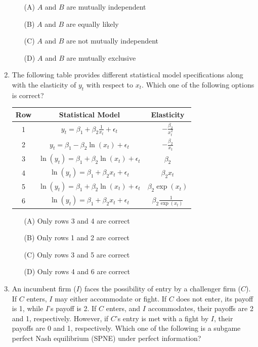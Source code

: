 \documentclass[journal,12pt,onecolumn]{exam}
\theoremstyle{remark}
\begin{document}
\begin{enumerate}
\begin{enumerate}
    \item[(A)] \(A\) and \(B\) are mutually independent
    \item[(B)] \(A\) and \(B\) are equally likely
    \item[(C)] \(A\) and \(B\) are not mutually independent
    \item[(D)] \(A\) and \(B\) are mutually exclusive
\end{enumerate}

\item The following table provides different statistical model specifications along with the elasticity of \( y_t \) with respect to \( x_t \). Which one of the following options is correct?

\begin{table}[h]
\centering
\begin{tabular}{|c|c|c|}
\hline
\textbf{Row} & \textbf{Statistical Model} & \textbf{Elasticity} \\ \hline
1 & \( y_t = \beta_1 + \beta_2 \frac{1}{x_t} + \epsilon_t \) & \( -\frac{\beta_2}{x_t^2} \) \\ \hline
2 & \( y_t = \beta_1 - \beta_2 \ln(x_t) + \epsilon_t \) & \( -\frac{\beta_2}{x_t} \) \\ \hline
3 & \( \ln(y_t) = \beta_1 + \beta_2 \ln(x_t) + \epsilon_t \) & \( \beta_2 \) \\ \hline
4 & \( \ln(y_t) = \beta_1 + \beta_2 x_t + \epsilon_t \) & \( \beta_2 x_t \) \\ \hline
5 & \( \ln(y_t) = \beta_1 + \beta_2 \ln(x_t) + \epsilon_t \) & \( \beta_2 \exp(x_t) \) \\ \hline
6 & \( \ln(y_t) = \beta_1 + \beta_2 x_t + \epsilon_t \) & \( \beta_2 \frac{1}{\exp(x_t)} \) \\ \hline
\end{tabular}
\end{table}

\begin{enumerate}
    \item[(A)] Only rows 3 and 4 are correct
    \item[(B)] Only rows 1 and 2 are correct
    \item[(C)] Only rows 3 and 5 are correct
    \item[(D)] Only rows 4 and 6 are correct
\end{enumerate}
\newpage

\item An incumbent firm (\(I\)) faces the possibility of entry by a challenger firm (\(C\)). If \(C\) enters, \(I\) may either accommodate or fight. If \(C\) does not enter, its payoff is 1, while \(I\)'s payoff is 2. If \(C\) enters, and \(I\) accommodates, their payoffs are 2 and 1, respectively. However, if \(C\)'s entry is met with a fight by \(I\), their payoffs are 0 and 1, respectively. Which one of the following is a \underline{\hspace{2cm}} subgame perfect Nash equilibrium (SPNE) under perfect information?


\end{enumerate}
\end{document}
